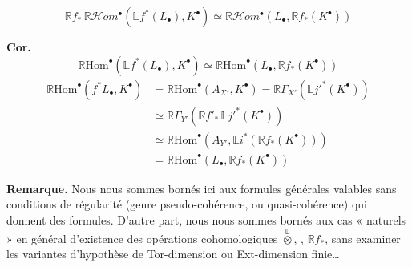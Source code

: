\documentclass[11pt,a4paper]{article}
\begin{document}
\ill{} 
\[
  \mathbb{R}f_{*}\, \mathbb{R}\mathcal{H}om^{\bullet}(\mathbb{L}f^{*}(L_{\bullet}), K^{\bullet})
  \simeq \mathbb{R}\mathcal{H}om^{\bullet}(L_{\bullet}, \mathbb{R}f_{*}(K^{\bullet}))
\]

\textbf{Cor.}
\[
  \mathbb{R}\mathrm{Hom}^{\bullet}(\mathbb{L}f^{*}(L_{\bullet}), K^{\bullet})
  \simeq \mathbb{R}\mathrm{Hom}^{\bullet}(L_{\bullet}, \mathbb{R}f_{*}(K^{\bullet}))
\]
\begin{align*}
  \mathbb{R}\mathrm{Hom}^{\bullet}(f^{*}L_{\bullet}, K^{\bullet})
  &= \mathbb{R}\mathrm{Hom}^{\bullet}(A_{X'}, K^{\bullet})
   = \mathbb{R}\Gamma_{X'}(\mathbb{L}j'^{*}(K^{\bullet})) \\
  &\simeq \mathbb{R}\Gamma_{Y'}(\mathbb{R}f'_{*}\, \mathbb{L}j'^{*}(K^{\bullet})) \\
  &\simeq \mathbb{R}\mathrm{Hom}^{\bullet}(A_{Y'}, \mathbb{L}i^{*}(\mathbb{R}f_{*}(K^{\bullet}))) \\
  &= \mathbb{R}\mathrm{Hom}^{\bullet}(L_{\bullet}, \mathbb{R}f_{*}(K^{\bullet}))
\end{align*}


\textbf{Remarque.} Nous nous sommes bornés ici aux formules générales valables sans conditions de régularité (genre pseudo-cohérence, ou quasi-cohérence) qui donnent des \ill{}   formules. D'autre part, nous nous sommes bornés aux cas « naturels » en général d'existence des opérations cohomologiques $\overset{\mathbb{L}}{\otimes}$, , $\mathbb{R}f_{*}$, sans examiner les variantes \struck{\ill{}} d'hypothèse de Tor-dimension ou Ext-dimension finie…
\end{document}

